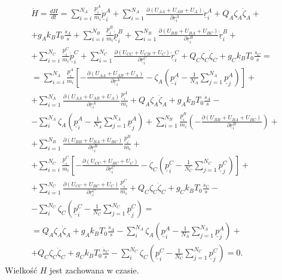 \documentclass[12pt,a4paper,openright]{report} %
\begin{document}
\begin{equation}
\begin{gathered}
\dot{H}=\frac{dH}{dt}=\sum_{i=i}^{N_A} \frac{{\underline{p}^A_i}}{m_i} {\underline{\dot{p}}^A_i}+ \sum_{i=1}^{N_A} \frac{\partial (U_{AA} + U_{AB} +U_{A})}{\partial \underline{r}^A_i} \underline{\dot{r}}^A_i + Q_A \zeta_A \dot{\zeta}_A + 
\\
+ g_A k_B T_0 \frac{\dot{s}_A}{s} + \sum_{i=i}^{N_B} \frac{{\underline{p}^B_i}}{m_i} {\underline{\dot{p}}^B_i}+ \sum_{i=1}^{N_B} \frac{\partial (U_{BB} + U_{BA} +U_{BC})}{\partial \underline{r}^B_i} \underline{\dot{r}}^B_i + 
\\
+\sum_{i=i}^{N_C} \frac{{\underline{p}^C_i}}{m_i} {\underline{\dot{p}}^C_i}+ \sum_{i=1}^{N_C} \frac{\partial (U_{CC} + U_{CB} +U_{C})}{\partial \underline{r}^C_i} \underline{\dot{r}}^C_i + Q_C \zeta_C \dot{\zeta}_C + g_C k_B T_0 \frac{\dot{s}_C}{s} = 
\\
=\sum_{i=i}^{N_A} \frac{{\underline{p}^A_i}}{m_i} \left[ - \frac{\partial (U_{AA} + U_{AB} +U_{A})}{\partial \underline{r}^A_i} - \zeta_A \left( \underline{p}^A_i - \frac{1}{N_A} \sum_{j=1}^{N_A} \underline{p}^A_j \right) \right] + 
\\
+ \sum_{i=1}^{N_A} \frac{\partial (U_{AA} + U_{AB} +U_{A})}{\partial \underline{r}^A_i} \frac{{\underline{p}^A_i}}{m_i} + Q_A \zeta_A \dot{\zeta}_A +g_A k_B T_0 \frac{\dot{s}_A}{s} - 
\\
- \sum_{i}^{N_A}\zeta_A (\underline{p}^A_i-\frac{1}{N_A}\sum_{j=1}^{N_A} \underline{p}^A_j)+
\sum_{i=1}^{N_B} \frac{\underline{p}^B_i}{m_i} \left( - \frac{\partial (U_{BB} + U_{BA} +U_{BC})}{\partial \underline{r}^B_i} \right) + 
\\
+ \sum_{i=1}^{N_B} \frac{\partial (U_{BB} + U_{BA} +U_{BC})}{\partial \underline{r}^B_i} \frac{\underline{p}^B_i}{m_i}+ 
\\
+\sum_{i=i}^{N_C} \frac{{\underline{p}^C_i}}{m_i} \left[ - \frac{\partial (U_{CC} + U_{BC} +U_{C})}{\partial \underline{r}^C_i} -\zeta_C \left( \underline{p}^C_i - \frac{1}{N_C} \sum_{j=1}^{N_C} \underline{p}^C_j \right) \right] + 
\\
+ \sum_{i=1}^{N_C} \frac{\partial (U_{CC} + U_{BC} +U_{C})}{\partial \underline{r}^C_i} \frac{{\underline{p}^C_i}}{m_i} + Q_C \zeta_C \dot{\zeta}_C + g_C k_B T_0 \frac{\dot{s}_C}{s} - 
\\
-\sum_{i}^{N_C}\zeta_C (\underline{p}^C_i-\frac{1}{N_C}\sum_{j=1}^{N_C} \underline{p}^C_j)= 
\\
= Q_A \zeta_A \dot{\zeta}_A + g_A k_B T_0 \frac{\dot{s}_A}{s} - \sum_{i}^{N_A}\zeta_A (\underline{p}^A_i-\frac{1}{N_A}\sum_{j=1}^{N_A} \underline{p}^A_j) + \\
+ Q_C \zeta_C \dot{\zeta}_C + g_C k_B T_0 \frac{\dot{s}_C}{s} - \sum_{i}^{N_C}\zeta_C (\underline{p}^C_i-\frac{1}{N_C}\sum_{j=1}^{N_C} \underline{p}^C_j)=0.
\end{gathered}
\end{equation}
%
%
Wielkość $H$ jest zachowana w czasie.
%
\end{document}
